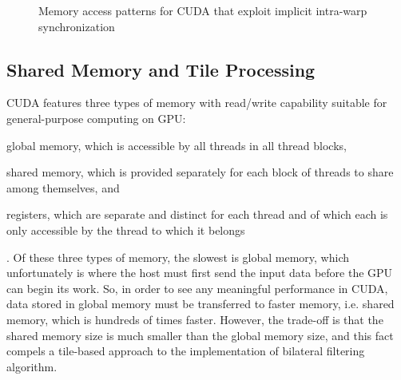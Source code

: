 \documentclass{IEEEtran}
\begin{document}
\begin{figure}
\label{fig:pspro}
\label{fig:pspro2}
\label{fig:pspro3}
\caption{Memory access patterns for CUDA that exploit implicit intra-warp synchronization}
\label{fig:intrawarp}
\end{figure}


\subsection{Shared Memory and Tile Processing}

CUDA features three types of memory with read/write capability suitable for general-purpose computing on GPU: \begin{inparaenum}[(i)] \item global memory, which is accessible by all threads in all thread blocks, \item shared memory, which is provided separately for each block of threads to share among themselves, and \item registers, which are separate and distinct for each thread and of which each is only accessible by the thread to which it belongs\end{inparaenum}. Of these three types of memory, the slowest is global memory, which unfortunately is where the host must first send the input data before the GPU can begin its work. So, in order to see any meaningful performance in CUDA, data stored in global memory must be transferred to faster memory, i.e. shared memory, which is hundreds of times faster. However, the trade-off is that the shared memory size is much smaller than the global memory size, and this fact compels a tile-based approach to the implementation of bilateral filtering algorithm.
\end{document}
